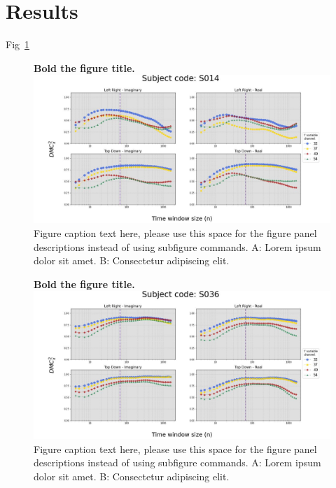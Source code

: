 \documentclass[10pt,letterpaper]{article}
\begin{document}
\section*{Results}

Fig~\ref{fig1} 

\begin{figure}[!h]
\caption{{\bf Bold the figure title.}
\includegraphics[width=.9\textwidth]{../output/figs/stats/S014.jpg}
Figure caption text here, please use this space for the figure panel descriptions instead of using subfigure commands. A: Lorem ipsum dolor sit amet. B: Consectetur adipiscing elit.}
\label{fig1}
\end{figure}


\begin{figure}[!h]
  \caption{{\bf Bold the figure title.}
  \includegraphics[width=.9\textwidth]{../output/figs/stats/S036.jpg}
  Figure caption text here, please use this space for the figure panel descriptions instead of using subfigure commands. A: Lorem ipsum dolor sit amet. B: Consectetur adipiscing elit.}
  \label{fig36}
  \end{figure}
\end{document}
